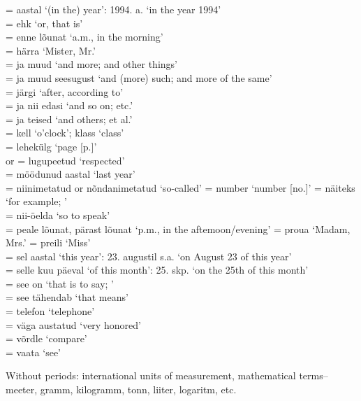 	\oneColumnTable
	 								= aastal `(in the) year': 1994. a. `in the year 1994' \\
	 								= ehk `or, that is' \\
	 							= enne lõunat `a.m., in the morning' \\
	 							= härra `Mister, Mr.' \\
	 							= ja muud `and more; and other things' \\
	 							= ja muud seesugust `and (more) such; and more of the same' \\
	 								= järgi `after, according to' \\
	 							= ja nii edasi `and so on; etc.' \\
	 							= ja teised `and others; et al.' \\
	 							= kell `o'clock'; klass `class' \\
	 							= lehekülg `page [p.]' \\
	 or  	= lugupeetud `respected' \\
		 						= möödunud aastal `last year' \\
	 							= niinimetatud or nõndanimetatud `so-called' 
	 							= number `number [no.]' 
	 						= näiteks `for example; \eg' \\
	 							= nii-öelda `so to speak' \\
	 							= peale lõunat, pärast lõunat `p.m., in the aftemoon/evening' 
	 							= proua `Madam, Mrs.' 
	 							= preili `Miss' \\
	 							= sel aastal `this year': 23. augustil s.a. `on August 23 of this year' \\
	 							= selle kuu päeval `of this month': 25. skp. `on the 25th of this month' \\
	 							= see on `that is to say; \ie' \\
	 							= see tähendab `that means' \\
	 							= telefon `telephone' \\
	 							= väga austatud `very honored' \\
	 							= võrdle `compare' \\
	 							= vaata `see' \\
	\tableEnd

Without periods: international units of measurement, mathematical terms-- meeter,  gramm,  kilogramm,  tonn,  liiter,  logaritm, etc.

\Text %

\Vocabulary %

\Exercises %

\Expressions %

\AnswersToExercises %